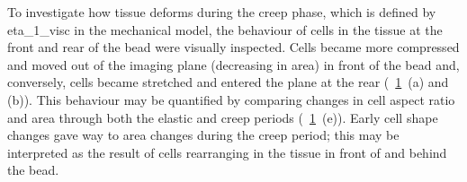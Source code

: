 \begin{figure}
{ %
 }\label{fig:cell_tracking}
\end{figure}
To investigate how tissue deforms during the creep phase, which is defined by \gls{eta_1_visc} in the mechanical model, the behaviour of cells in the tissue at the front and rear of the bead were visually inspected.
Cells became more compressed and moved out of the imaging plane (decreasing in area) in front of the bead and, conversely, cells became stretched and entered  the plane at the rear (\figurename~\ref{fig:cell_tracking}~(a) and (b)).
This behaviour may be quantified by comparing changes in cell aspect ratio and area through both the elastic and creep periods (\figurename~\ref{fig:cell_tracking}~(e)).
Early cell shape changes gave way to area changes during the creep period; this may be interpreted as the result of cells rearranging in the tissue in front of and behind the bead.


